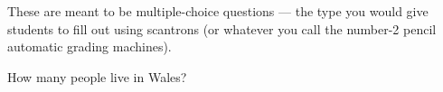 \documentclass[10pt]{examdesign} %
\begin{document}
\begin{multiplechoice}[title={A title}, resetcounter=no]
	These are meant to be multiple-choice questions --- the type you
    would give students to fill out using scantrons (or whatever you
    call the number-2 pencil automatic grading machines).
	\begin{question}        
		How many people live in Wales?
    \end{question}    
\end{multiplechoice}
\end{document}
